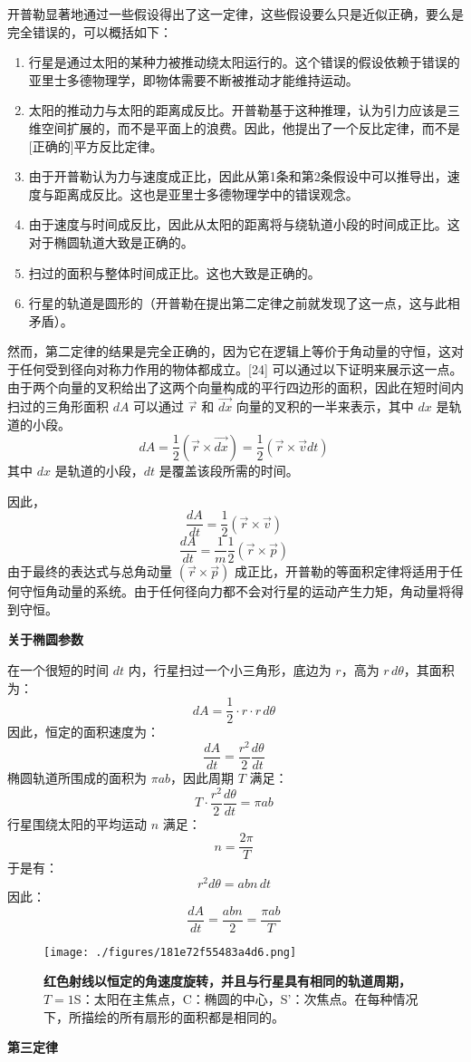 开普勒显著地通过一些假设得出了这一定律，这些假设要么只是近似正确，要么是完全错误的，可以概括如下：
\begin{enumerate}
\item 行星是通过太阳的某种力被推动绕太阳运行的。这个错误的假设依赖于错误的亚里士多德物理学，即物体需要不断被推动才能维持运动。 
\item 太阳的推动力与太阳的距离成反比。开普勒基于这种推理，认为引力应该是三维空间扩展的，而不是平面上的浪费。因此，他提出了一个反比定律，而不是[正确的]平方反比定律。 
\item 由于开普勒认为力与速度成正比，因此从第1条和第2条假设中可以推导出，速度与距离成反比。这也是亚里士多德物理学中的错误观念。
\item 由于速度与时间成反比，因此从太阳的距离将与绕轨道小段的时间成正比。这对于椭圆轨道大致是正确的。
\item 扫过的面积与整体时间成正比。这也大致是正确的。
\item 行星的轨道是圆形的（开普勒在提出第二定律之前就发现了这一点，这与此相矛盾）。
\end{enumerate}
然而，第二定律的结果是完全正确的，因为它在逻辑上等价于角动量的守恒，这对于任何受到径向对称力作用的物体都成立。[24] 可以通过以下证明来展示这一点。由于两个向量的叉积给出了这两个向量构成的平行四边形的面积，因此在短时间内扫过的三角形面积 \( dA \) 可以通过 \( \vec{r} \) 和 \( \vec{dx} \) 向量的叉积的一半来表示，其中 \( dx \) 是轨道的小段。
\[
dA = \frac{1}{2} (\vec{r} \times \vec{dx}) = \frac{1}{2} (\vec{r} \times \vec{v} dt)~
\]
其中 \( dx \) 是轨道的小段，\( dt \) 是覆盖该段所需的时间。

因此，
\[
\frac{dA}{dt} = \frac{1}{2} (\vec{r} \times \vec{v})~
\]
\[
\frac{dA}{dt} = \frac{1}{m} \frac{1}{2} (\vec{r} \times \vec{p})~
\]
由于最终的表达式与总角动量 \( (\vec{r} \times \vec{p}) \) 成正比，开普勒的等面积定律将适用于任何守恒角动量的系统。由于任何径向力都不会对行星的运动产生力矩，角动量将得到守恒。

\textbf{关于椭圆参数}

在一个很短的时间 \( dt \) 内，行星扫过一个小三角形，底边为 \( r \)，高为 \( r \, d\theta \)，其面积为：
\[
dA = \frac{1}{2} \cdot r \cdot r \, d\theta~
\]
因此，恒定的面积速度为：
\[
\frac{dA}{dt} = \frac{r^{2}}{2} \frac{d\theta}{dt}~
\]
椭圆轨道所围成的面积为 \( \pi ab \)，因此周期 \( T \) 满足：
\[
T \cdot \frac{r^{2}}{2} \frac{d\theta}{dt} = \pi ab~
\]
行星围绕太阳的平均运动 \( n \) 满足：
\[
n = \frac{2\pi}{T}~
\]
于是有：
\[
r^{2} d\theta = abn \, dt~
\]
因此：
\[
\frac{dA}{dt} = \frac{abn}{2} = \frac{\pi ab}{T}~
\]
\begin{figure}[ht]
\centering
\texttt{[image: ./figures/181e72f55483a4d6.png]}
\caption{\textbf{红色射线以恒定的角速度旋转，并且与行星具有相同的轨道周期，}\(T = 1\)S：太阳在主焦点，C：椭圆的中心，S'：次焦点。在每种情况下，所描绘的所有扇形的面积都是相同的。} \label{fig_KPL_5}
\end{figure}
\textbf{第三定律}

